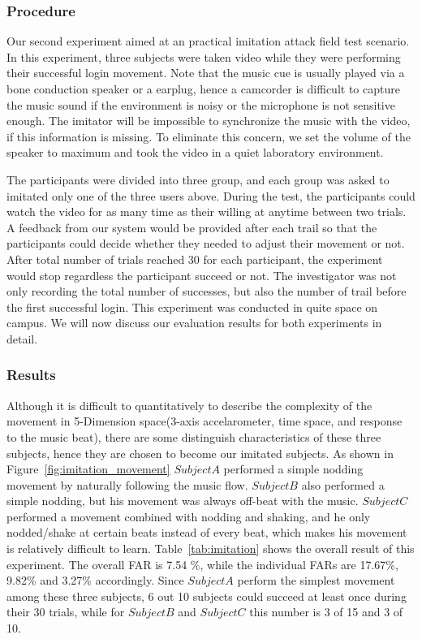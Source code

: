 \subsubsection{Procedure}
Our second experiment aimed at an practical imitation attack field test scenario. In this experiment, three subjects were taken video while they were performing their successful login movement. Note that the music cue is usually played via a bone conduction speaker or a earplug, hence a camcorder is difficult to capture the music sound if the environment is noisy or the microphone is not sensitive enough. The imitator will be impossible to synchronize the music with the video, if this information is missing. To eliminate this concern, we set the volume of the speaker to maximum and took the video in a quiet laboratory environment. 

The participants were divided into three group, and each group was asked to imitated only one of the three users above. During the test, the participants could watch the video for as many time as their willing at anytime between two trials. A feedback from our system would be provided after each trail so that the participants could decide whether they needed to adjust their movement or not. After total number of trials reached 30 for each participant, the experiment would stop regardless the participant succeed or not. The investigator was not only recording the total number of successes, but also the number of trail before the first successful login. This experiment was conducted in quite space on campus. We will now discuss our evaluation results for both experiments in detail. 

\subsubsection{Results}
Although it is difficult to quantitatively to describe the complexity of the movement in 5-Dimension space(3-axis accelarometer, time space,  and response to the music beat), there are some distinguish characteristics of these three subjects, hence they are chosen to become our imitated subjects. As shown in Figure~\ref{fig:imitation_movement} $Subject A$ performed a simple nodding movement by naturally following the music flow. $Subject B$ also performed a simple nodding, but his movement was always off-beat with the music. $Subject C$ performed a movement combined with nodding and shaking, and he only nodded/shake at certain beats instead of every beat, which makes his movement is relatively difficult to learn. Table~\ref{tab:imitation} shows the overall result of this experiment. The overall FAR is 7.54 \%, while the individual FARs are 17.67\%, 9.82\% and 3.27\% accordingly.  Since $Subject A$ perform the simplest movement among these three subjects, 6 out 10 subjects could succeed at least once during their 30 trials, while for $Subject B$ and $Subject C$ this number is 3 of 15 and 3 of 10. 


